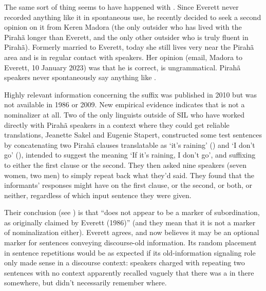 \documentclass[output=paper,colorlinks,citecolor=brown
]{langscibook}
\begin{document}
The same sort of thing seems to have happened with .
Since Everett never recorded anything like it in spontaneous use, he
recently decided to seek a second opinion on it from Keren Madora (the
only outsider who has lived with the Pirah{\~a} longer than Everett, and
the only other outsider who is truly fluent in Pirah{\~a}).
Formerly married to Everett, today she still lives very near the
Pirah{\~a} area and is in regular contact with speakers. Her opinion
(email, Madora to Everett, 10 January 2023) was that he is correct,
 is ungrammatical. Pirah{\~a} speakers never
spontaneously say anything like .

Highly relevant information concerning the suffix \mbox{}
was published in 2010 but was not available in 1986 or 2009. New empirical
evidence indicates that \mbox{} is not a nominalizer at all.
Two of the only linguists outside of SIL who have worked directly
with Pirah{\~a} speakers in a context where they could get reliable
translations, Jeanette Sakel and Eugenie Stapert, constructed some
test sentences by concatenating two Pirah{\~a} clauses translatable
as `it's raining' () and `I don't go' (), intended to suggest the meaning `If it's raining,
I don't go', and suffixing \mbox{} to either the first
clause or the second. They then asked nine speakers (seven women, two
men) to simply repeat back what they'd said. They found that the
informants' responses might have \mbox{} on the first
clause, or the second, or both, or neither, regardless of which input
sentence they were given.

Their conclusion (see \citealt[5--6]{SakeStap10}) is that
\mbox{} ``does not appear to be a marker of subordination,
as originally claimed by Everett (1986)'' (and they mean that it is
not a marker of nominalization either). Everett agrees, and now
believes it may be an optional marker for sentences conveying
discourse-old information. Its random placement in sentence repetitions
would be as expected if its old-information signaling role only made
sense in a discourse context: speakers charged with repeating two
sentences with no context apparently recalled vaguely that there was
a \mbox{} in there somewhere, but didn't necessarily
remember where.
\end{document}
